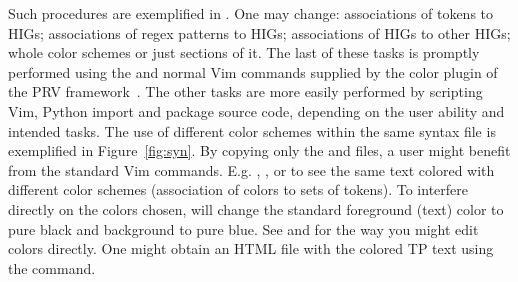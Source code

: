 \noindent Such procedures are exemplified in .
One may change: associations of tokens to HIGs;
associations of regex patterns to HIGs;
associations of HIGs to other HIGs;
whole color schemes or just sections of it.
The last of these tasks is promptly performed using 
the  and  normal Vim commands
supplied by the color plugin of the PRV framework~\cite{vim}.
The other tasks are more easily performed by
scripting Vim, Python import and package source code,
depending on the user ability and intended tasks.
The use of different color schemes within the same syntax
file is exemplified in Figure~\ref{fig:syn}.
By copying only the  and  files,
a user might benefit from the standard Vim commands.
E.g. ,
,  or
 to see the same text colored
with different color schemes (association of colors to sets of tokens).
To interfere directly on the colors chosen,
will change the standard foreground (text) color to pure black
and background to pure blue.
See  and 
for the way you might edit colors directly.
One might obtain an HTML file with the colored TP text
using the  command.


